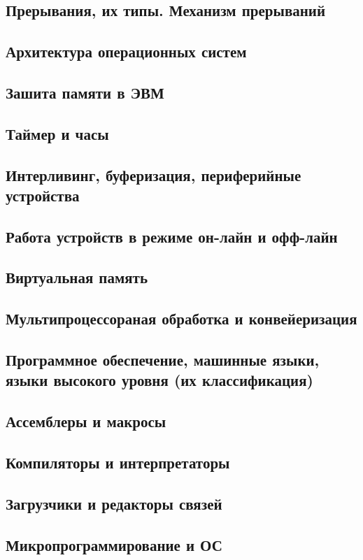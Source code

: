 \documentclass[a4paper,12pt,notitlepage,pdftex,headsepline]{scrartcl}
\begin{document}
  \subsection{Прерывания, их типы. Механизм прерываний}
  \subsection{Архитектура операционных систем}
  \subsection{Зашита памяти в ЭВМ}
  \subsection{Таймер и часы}
  \subsection{Интерливинг, буферизация, периферийные устройства}
  \subsection{Работа устройств в режиме он-лайн и офф-лайн}
  \subsection{Виртуальная память}
  \subsection{Мультипроцессораная обработка и конвейеризация}
  \subsection{Программное обеспечение, машинные языки, языки высокого уровня (их классификация)}
  \subsection{Ассемблеры и макросы}
  \subsection{Компиляторы и интерпретаторы}
  \subsection{Загрузчики и редакторы связей}
  \subsection{Микропрограммирование и ОС}
\end{document}
